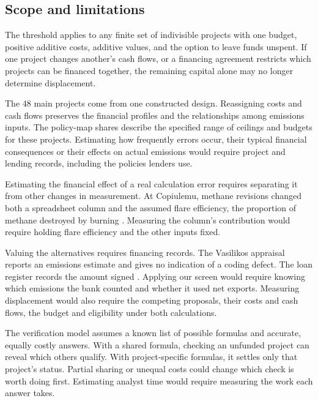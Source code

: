 \subsection{Scope and limitations}
The threshold applies to any finite set of indivisible projects with one budget, positive additive costs, additive values, and the option to leave funds unspent. If one project changes another's cash flows, or a financing agreement restricts which projects can be financed together, the remaining capital alone may no longer determine displacement.

The 48 main projects come from one constructed design. Reassigning costs and cash flows preserves the financial profiles and the relationships among emissions inputs. The policy-map shares describe the specified range of ceilings and budgets for these projects. Estimating how frequently errors occur, their typical financial consequences or their effects on actual emissions would require project and lending records, including the policies lenders use.

Estimating the financial effect of a real calculation error requires separating it from other changes in measurement. At Copiulemu, methane revisions changed both a spreadsheet column and the assumed flare efficiency, the proportion of methane destroyed by burning \citep[pp.~9--11, 14]{sgs}. Measuring the column's contribution would require holding flare efficiency and the other inputs fixed.

Valuing the alternatives requires financing records. The Vasilikos appraisal reports an emissions estimate and gives no indication of a coding defect. The loan register records the amount signed \citep{eibscore,eibloan}. Applying our screen would require knowing which emissions the bank counted and whether it used net exports. Measuring displacement would also require the competing proposals, their costs and cash flows, the budget and eligibility under both calculations.

The verification model assumes a known list of possible formulas and accurate, equally costly answers. With a shared formula, checking an unfunded project can reveal which others qualify. With project-specific formulas, it settles only that project's status. Partial sharing or unequal costs could change which check is worth doing first. Estimating analyst time would require measuring the work each answer takes.

